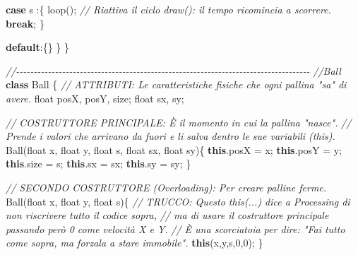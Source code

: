 \documentclass[
]{article}
\newenvironment{Shaded}{}{}
\newcommand{\CharTok}[1]{\textcolor[rgb]{0.25,0.44,0.63}{#1}}
\newcommand{\CommentTok}[1]{\textcolor[rgb]{0.38,0.63,0.69}{\textit{#1}}}
\newcommand{\ControlFlowTok}[1]{\textcolor[rgb]{0.00,0.44,0.13}{\textbf{#1}}}
\newcommand{\DataTypeTok}[1]{\textcolor[rgb]{0.56,0.13,0.00}{#1}}
\newcommand{\DecValTok}[1]{\textcolor[rgb]{0.25,0.63,0.44}{#1}}
\newcommand{\FunctionTok}[1]{\textcolor[rgb]{0.02,0.16,0.49}{#1}}
\newcommand{\KeywordTok}[1]{\textcolor[rgb]{0.00,0.44,0.13}{\textbf{#1}}}
\newcommand{\NormalTok}[1]{#1}
\newcommand{\OperatorTok}[1]{\textcolor[rgb]{0.40,0.40,0.40}{#1}}
\begin{document}
\begin{Shaded}
\begin{Highlighting}[]
    \ControlFlowTok{case} \CharTok{\textquotesingle{}s\textquotesingle{}} \OperatorTok{:\{} 
      \FunctionTok{loop}\OperatorTok{();}   \CommentTok{// Riattiva il ciclo draw(): il tempo ricomincia a scorrere.}
      \ControlFlowTok{break}\OperatorTok{;}
    \OperatorTok{\}}
    
    \KeywordTok{default}\OperatorTok{:\{\}}
  \OperatorTok{\}}
\OperatorTok{\}}

\CommentTok{//{-}{-}{-}{-}{-}{-}{-}{-}{-}{-}{-}{-}{-}{-}{-}{-}{-}{-}{-}{-}{-}{-}{-}{-}{-}{-}{-}{-}{-}{-}{-}{-}{-}{-}{-}{-}{-}{-}{-}{-}{-}{-}{-}{-}{-}{-}{-}{-}{-}{-}{-}{-}{-}{-}{-}{-}{-}{-}{-}{-}{-}{-}{-}{-}{-}{-}{-}{-}{-}{-}{-}{-}{-}{-}{-}{-}{-}{-}{-}{-}{-}{-}{-}}
\CommentTok{//Ball}
\KeywordTok{class}\NormalTok{ Ball }\OperatorTok{\{}
  \CommentTok{// ATTRIBUTI: Le caratteristiche fisiche che ogni pallina "sa" di avere.}
  \DataTypeTok{float}\NormalTok{ posX}\OperatorTok{,}\NormalTok{ posY}\OperatorTok{,}\NormalTok{ size}\OperatorTok{;} 
  \DataTypeTok{float}\NormalTok{ sx}\OperatorTok{,}\NormalTok{ sy}\OperatorTok{;} 

  \CommentTok{// COSTRUTTORE PRINCIPALE: È il momento in cui la pallina "nasce".}
  \CommentTok{// Prende i valori che arrivano da fuori e li salva dentro le sue variabili (this).}
  \FunctionTok{Ball}\OperatorTok{(}\DataTypeTok{float}\NormalTok{ x}\OperatorTok{,} \DataTypeTok{float}\NormalTok{ y}\OperatorTok{,} \DataTypeTok{float}\NormalTok{ s}\OperatorTok{,} \DataTypeTok{float}\NormalTok{ sx}\OperatorTok{,} \DataTypeTok{float}\NormalTok{ sy}\OperatorTok{)\{} 
    \KeywordTok{this}\OperatorTok{.}\FunctionTok{posX} \OperatorTok{=}\NormalTok{ x}\OperatorTok{;} 
    \KeywordTok{this}\OperatorTok{.}\FunctionTok{posY} \OperatorTok{=}\NormalTok{ y}\OperatorTok{;}
    \KeywordTok{this}\OperatorTok{.}\FunctionTok{size} \OperatorTok{=}\NormalTok{ s}\OperatorTok{;}
    \KeywordTok{this}\OperatorTok{.}\FunctionTok{sx} \OperatorTok{=}\NormalTok{ sx}\OperatorTok{;}
    \KeywordTok{this}\OperatorTok{.}\FunctionTok{sy} \OperatorTok{=}\NormalTok{ sy}\OperatorTok{;}
  \OperatorTok{\}}
  
  \CommentTok{// SECONDO COSTRUTTORE (Overloading): Per creare palline ferme.}
  \FunctionTok{Ball}\OperatorTok{(}\DataTypeTok{float}\NormalTok{ x}\OperatorTok{,} \DataTypeTok{float}\NormalTok{ y}\OperatorTok{,} \DataTypeTok{float}\NormalTok{ s}\OperatorTok{)\{} 
    \CommentTok{// TRUCCO: Questo \textquotesingle{}this(...)\textquotesingle{} dice a Processing di non riscrivere tutto il codice sopra,}
    \CommentTok{// ma di usare il costruttore principale passando però 0 come velocità X e Y.}
    \CommentTok{// È una scorciatoia per dire: "Fai tutto come sopra, ma forzala a stare immobile".}
    \KeywordTok{this}\OperatorTok{(}\NormalTok{x}\OperatorTok{,}\NormalTok{y}\OperatorTok{,}\NormalTok{s}\OperatorTok{,}\DecValTok{0}\OperatorTok{,}\DecValTok{0}\OperatorTok{);} 
  \OperatorTok{\}}
  

\end{Highlighting}
\end{Shaded}
\end{document}
